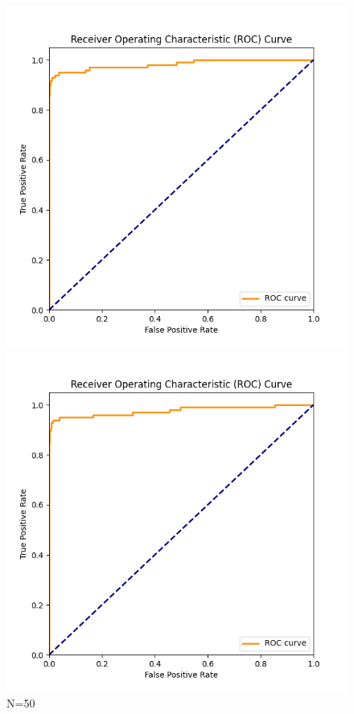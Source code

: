 \documentclass[8pt]{article}
\begin{document}
\begin{figure}[H]
    \centering
    \begin{minipage}{0.24\textwidth}
        \centering
        \includegraphics[width=\textwidth]{../Prob1/out/rand_seed_14/task3/roc_curve_N_50_K_7.png}
        \caption{N=50}
        \label{fig:roc_curve_N_50_K_7}
    \end{minipage}
    \begin{minipage}{0.24\textwidth}
        \centering
        \includegraphics[width=\textwidth]{../Prob1/out/rand_seed_14/task3/roc_curve_N_100_K_7.png}

\end{minipage}
\end{figure}
\end{document}
